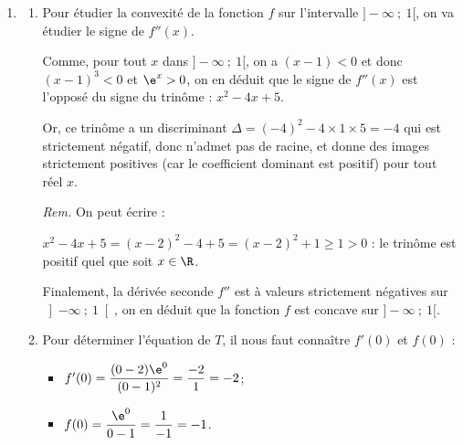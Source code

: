\begin{enumerate}
\begin{enumerate}
$x - 2 \geqslant 0 \iff x \geqslant 2$, donc sur $ ]-\infty ~;~ 1[ $, $(x-2)$ est  strictement négatif, donc $f'(x)$ également.

Finalement, on peut donc en déduire que $f$ est strictement décroissante sur $]-\infty ~;~ 1[$, et donc, on a le tableau de variations suivant (avec les limites justifiées aux questions \textbf{1. a.} et \textbf{2.}):

\begin{center}
\end{center}
	\end{enumerate}

\item \begin{enumerate}
		\item Pour étudier la convexité de la fonction $f$ sur l'intervalle $]-\infty~;~1[$, on va étudier le signe de $f''(x)$.

		Comme, pour tout $x$ dans $ ]-\infty ~;~1[ $, on a $(x - 1) < 0$ et donc $(x - 1)^3 < 0$ et $\e^{x} > 0$, on en déduit que le signe de $f''(x)$ est l'opposé du signe du trinôme : $x^2 - 4x + 5$.

Or, ce trinôme a un discriminant $\Delta = (-4)^2 - 4 \times 1 \times 5 = -4 $ qui est strictement négatif, donc n'admet pas de racine, et donne des images strictement positives (car le coefficient dominant est positif) pour tout réel $x$.

\emph{Rem.} On peut écrire :

$x^2 - 4x + 5 = (x - 2)^2 - 4 + 5 = (x - 2)^2 + 1 \geqslant 1 > 0$ : le trinôme est positif quel que soit $x \in \R$.

Finalement, la dérivée seconde $f''$ est à valeurs strictement négatives sur $\left]-\infty ~;~ 1\right[$, on en déduit que la fonction $f$ est concave sur $]-\infty ~;~ 1[$.

		\item Pour déterminer l'équation de $T$, il nous faut connaître $f'(0)$ et $f(0)$ :

\begin{itemize}[left=5mm]
\item $f'(0) = \dfrac{(0 - 2)\e^{0}}{(0 - 1)^2} = \dfrac{-2}{1} = -2$;
\item $f(0) = \dfrac{\e^0}{0 - 1} = \dfrac{1}{-1} = -1$.
\end{itemize}


\end{enumerate}
\end{enumerate}
